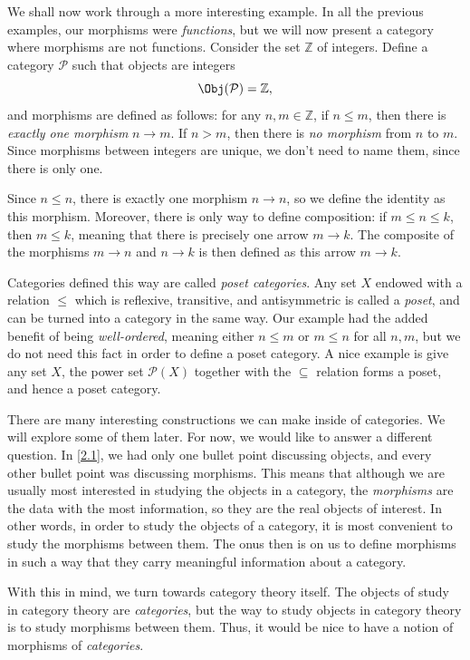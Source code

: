 \documentclass[11pt, A4]{article}
\begin{document}
We shall now work through a more interesting example. In all the previous examples, our morphisms were \emph{functions}, but we will now present a category where morphisms are not functions. Consider the set $\mathbb{Z} $ of integers. Define a category $\mathcal{P} $ such that objects are integers
\[
	\Obj(\mathcal{P} ) =\mathbb{Z} ,
\]
and morphisms are defined as follows: for any $n,m\in\mathbb{Z} $, if $n\leq m$, then there is \emph{exactly one morphism} $n\to m$. If $n>m$, then there is \emph{no morphism} from $n$ to $m$. Since morphisms between integers are unique, we don't need to name them, since there is only one.

Since $n\leq n$, there is exactly one morphism $n\to n$, so we define the identity as this morphism. Moreover, there is only way to define composition: if $m\leq n\leq k$, then $m\leq k$, meaning that there is precisely one arrow $m\to k$. The composite of the morphisms $m\to n$ and $n\to k$ is then defined as this arrow $m\to k$.

Categories defined this way are called \emph{poset categories}. Any set $X$ endowed with a relation $\leq $ which is reflexive, transitive, and antisymmetric is called a \emph{poset}, and can be turned into a category in the same way. Our example had the added benefit of being \emph{well-ordered}, meaning either $n\leq m$ or $m\leq n$ for all $n,m$, but we do not need this fact in order to define a poset category. A nice example is give any set $X$, the power set $\mathcal{P} (X)$ together with the $\subseteq $ relation forms a poset, and hence a poset category.

There are many interesting constructions we can make inside of categories. We will explore some of them later. For now, we would like to answer a different question. In \cref{2.1}, we had only one bullet point discussing objects, and every other bullet point was discussing morphisms. This means that although we are usually most interested in studying the objects in a category, the \emph{morphisms} are the data with the most information, so they are the real objects of interest. In other words, in order to study the objects of a category, it is most convenient to study the morphisms between them. The onus then is on us to define morphisms in such a way that they carry meaningful information about a category.

With this in mind, we turn towards category theory itself. The objects of study in category theory are \emph{categories}, but the way to study objects in category theory is to study morphisms between them. Thus, it would be nice to have a notion of morphisms of \emph{categories}.
\end{document}
